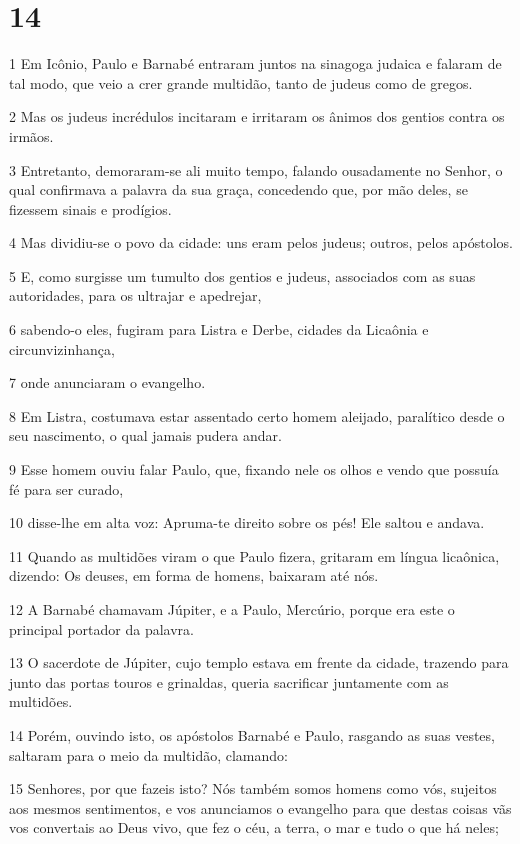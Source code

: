 \chapter{14}

\par 1 Em Icônio, Paulo e Barnabé entraram juntos na sinagoga judaica e falaram de tal modo, que veio a crer grande multidão, tanto de judeus como de gregos.
\par 2 Mas os judeus incrédulos incitaram e irritaram os ânimos dos gentios contra os irmãos.
\par 3 Entretanto, demoraram-se ali muito tempo, falando ousadamente no Senhor, o qual confirmava a palavra da sua graça, concedendo que, por mão deles, se fizessem sinais e prodígios.
\par 4 Mas dividiu-se o povo da cidade: uns eram pelos judeus; outros, pelos apóstolos.
\par 5 E, como surgisse um tumulto dos gentios e judeus, associados com as suas autoridades, para os ultrajar e apedrejar,
\par 6 sabendo-o eles, fugiram para Listra e Derbe, cidades da Licaônia e circunvizinhança,
\par 7 onde anunciaram o evangelho.
\par 8 Em Listra, costumava estar assentado certo homem aleijado, paralítico desde o seu nascimento, o qual jamais pudera andar.
\par 9 Esse homem ouviu falar Paulo, que, fixando nele os olhos e vendo que possuía fé para ser curado,
\par 10 disse-lhe em alta voz: Apruma-te direito sobre os pés! Ele saltou e andava.
\par 11 Quando as multidões viram o que Paulo fizera, gritaram em língua licaônica, dizendo: Os deuses, em forma de homens, baixaram até nós.
\par 12 A Barnabé chamavam Júpiter, e a Paulo, Mercúrio, porque era este o principal portador da palavra.
\par 13 O sacerdote de Júpiter, cujo templo estava em frente da cidade, trazendo para junto das portas touros e grinaldas, queria sacrificar juntamente com as multidões.
\par 14 Porém, ouvindo isto, os apóstolos Barnabé e Paulo, rasgando as suas vestes, saltaram para o meio da multidão, clamando:
\par 15 Senhores, por que fazeis isto? Nós também somos homens como vós, sujeitos aos mesmos sentimentos, e vos anunciamos o evangelho para que destas coisas vãs vos convertais ao Deus vivo, que fez o céu, a terra, o mar e tudo o que há neles;
